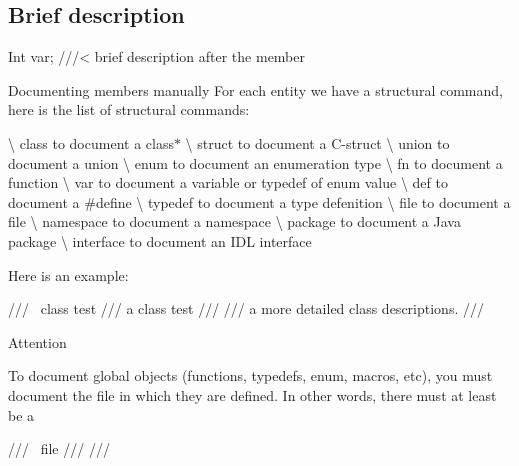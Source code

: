 \subsection*{Brief description}

\begin{DoxyVerb}Int var;        ///< brief description after the member
\end{DoxyVerb}


Documenting members manually For each entity we have a structural command, here is the list of structural commands\+:

\textbackslash{} class to document a class$\ast$ \textbackslash{} struct to document a C-\/struct \textbackslash{} union to document a union \textbackslash{} enum to document an enumeration type \textbackslash{} fn to document a function \textbackslash{} var to document a variable or typedef of enum value \textbackslash{} def to document a \#define \textbackslash{} typedef to document a type defenition \textbackslash{} file to document a file \textbackslash{} namespace to document a namespace \textbackslash{} package to document a Java package \textbackslash{} interface to document an I\+DL interface

Here is an example\+: \begin{DoxyVerb}/// \ class test
///     \brief a class test
/// 
/// a more detailed class descriptions.
///
\end{DoxyVerb}


Attention

To document global objects (functions, typedefs, enum, macros, etc), you must document the file in which they are defined. In other words, there must at least be a \begin{DoxyVerb}/// \ file
/// 
///
\end{DoxyVerb}
 